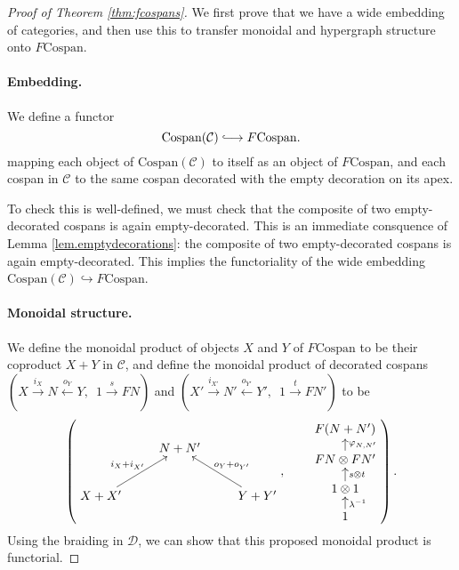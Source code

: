 \begin{proof}[Proof of Theorem \ref{thm:fcospans}]
We first prove that we have a wide embedding of categories, and then use this to
transfer monoidal and hypergraph structure onto $F\mathrm{Cospan}$.

\paragraph{Embedding.} 
  We define a functor 
  \[
    \mathrm{Cospan(\mathcal C)} \hooklongrightarrow F\mathrm{Cospan}.
  \]
  mapping each object of $\mathrm{Cospan(\mathcal C)}$ to itself as an object
  of $F\mathrm{Cospan}$, and each cospan in $\mathcal C$ to the same cospan
  decorated with the empty decoration on its apex. 
  
  To check this is well-defined, we must check that the composite of two
  empty-decorated cospans is again empty-decorated. This is an immediate
  consquence of Lemma \ref{lem.emptydecorations}: the composite of two
  empty-decorated cospans is again empty-decorated. This implies the
  functoriality of the wide embedding $\mathrm{Cospan(\mathcal{C})}
  \hookrightarrow F\mathrm{Cospan}$.

\paragraph{Monoidal structure.} 

  We define the monoidal product of objects $X$ and $Y$ of $F\mathrm{Cospan}$ to
  be their coproduct $X+Y$ in $\mathcal C$, and define the monoidal product of
  decorated cospans $(X \stackrel{i_X}\longrightarrow N
  \stackrel{o_Y}\longleftarrow Y,\enspace 1 \stackrel{s}\longrightarrow FN)$ and
  $(X' \stackrel{i_{X'}}\longrightarrow N' \stackrel{o_{Y'}}\longleftarrow
  Y',\enspace 1 \stackrel{t}\longrightarrow FN')$ to be 
  \[
    \left(
    \begin{aligned}
      \xymatrix{
	& N+N' \\  
	X+X' \ar[ur]^{i_X+i_{X'}} && Y+Y' \ar[ul]_{o_Y+o_{Y'}}
      }
    \end{aligned}
    ,
    \qquad
    \begin{aligned}
      \xymatrixrowsep{.8pc}
      \xymatrix{
	F(N+N') \\
	FN \otimes FN' \ar[u]_{\varphi_{N,N'}}\\
	1 \otimes 1 \ar[u]_{s \otimes t} \\
	1 \ar[u]_{\lambda^{-1}}
      }
    \end{aligned}
    \right).
  \]
  Using the braiding in $\mathcal D$, we can show that this proposed monoidal
  product is functorial. 
 

\end{proof}
